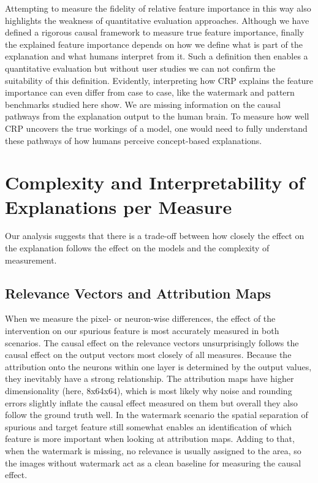 Attempting to measure the fidelity of relative feature importance in this way also highlights the weakness of quantitative evaluation approaches. 
Although we have defined a rigorous causal framework to measure true feature importance, finally the explained feature importance depends on how we define what is part of the explanation and what humans interpret from it. Such a definition then enables a quantitative evaluation but without user studies we can not confirm the suitability of this definition. Evidently, interpreting how CRP explains the feature importance can even differ from case to case, like the watermark and pattern benchmarks studied here show. 
We are missing information on the causal pathways from the explanation output to the human brain. To measure how well CRP uncovers the true workings of a model, one would need to fully understand these pathways of how humans perceive concept-based explanations.

\section{Complexity and Interpretability of Explanations per Measure}
Our analysis suggests that there is a trade-off between how closely the effect on the explanation follows the effect on the models and the complexity of measurement. 

\subsection{Relevance Vectors and Attribution Maps}
When we measure the pixel- or neuron-wise differences, the effect of the intervention on our spurious feature is most accurately measured in both scenarios. 
The causal effect on the relevance vectors unsurprisingly follows the causal effect on the output vectors most closely of all measures. Because the attribution onto the neurons within one layer is determined by the output values, they inevitably have a strong relationship. The attribution maps  have higher dimensionality (here, 8x64x64), which is most likely why noise and rounding errors slightly inflate the causal effect measured on them but overall they also follow the ground truth well.   
In the watermark scenario the spatial separation of spurious and target feature still somewhat enables an identification of which feature is more important when looking at attribution maps. Adding to that, when the watermark is missing, no relevance is usually assigned to the area, so the images without watermark act as a clean baseline for measuring the causal effect. 

